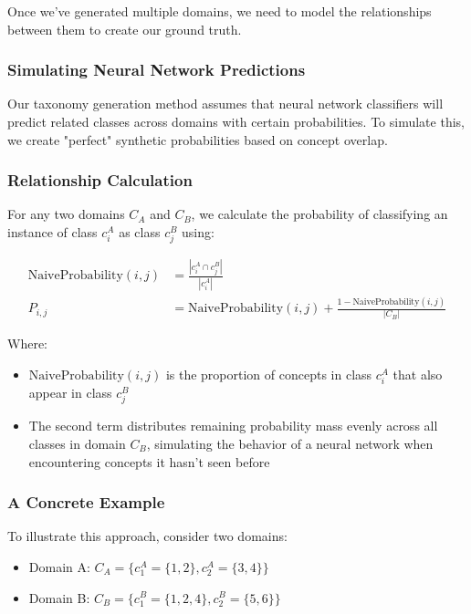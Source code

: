 Once we've generated multiple domains, we need to model the relationships between them to create our ground truth.

\subsubsection{Simulating Neural Network Predictions}

Our taxonomy generation method assumes that neural network classifiers will predict related classes across domains with certain probabilities. To simulate this, we create "perfect" synthetic probabilities based on concept overlap.

\subsubsection{Relationship Calculation}

For any two domains $C_A$ and $C_B$, we calculate the probability of classifying an instance of class $c^A_i$ as class $c^B_j$ using:

\begin{equation}
    \begin{aligned}
        \text{NaiveProbability}(i, j) & = \frac{|c^A_i \cap c^B_j|}{|c^A_i|}                                              \\
        P_{i,j}                       & = \text{NaiveProbability}(i, j) + \frac{1 - \text{NaiveProbability}(i, j)}{|C_B|}
    \end{aligned}
\end{equation}

Where:
\begin{itemize}
    \item $\text{NaiveProbability}(i, j)$ is the proportion of concepts in class $c_i^A$ that also appear in class $c_j^B$
    \item The second term distributes remaining probability mass evenly across all classes in domain $C_B$, simulating the behavior of a neural network when encountering concepts it hasn't seen before
\end{itemize}

\subsubsection{A Concrete Example}

To illustrate this approach, consider two domains:
\begin{itemize}
    \item Domain A: $C_A = \{c^A_1=\{1,2\}, c^A_2=\{3,4\}\}$
    \item Domain B: $C_B = \{c^B_1=\{1,2,4\}, c^B_2=\{5,6\}\}$
\end{itemize}

